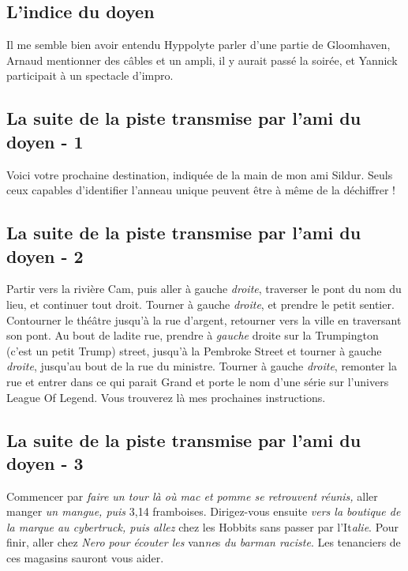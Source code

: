 \documentclass[12pt]{article}
\begin{document}
\subsection{L'indice du doyen}

Il me semble bien avoir entendu Hyppolyte parler d'une partie de Gloomhaven, Arnaud mentionner des câbles et un ampli, il y aurait passé la soirée, et Yannick participait à un spectacle d'impro.

\subsection{La suite de la piste transmise par l'ami du doyen - 1}

Voici votre prochaine destination, indiquée de la main de mon ami Sildur. Seuls ceux capables d'identifier l'anneau unique peuvent être à même de la déchiffrer !


\subsection{La suite de la piste transmise par l'ami du doyen - 2}

Partir vers la rivière Cam, puis aller à gauche {\it droite}, traverser le pont du nom du lieu, et continuer tout droit.
Tourner à gauche {\it droite}, et prendre le petit sentier.
Contourner le théâtre jusqu'à la rue d'argent, retourner vers la ville en traversant son pont. Au bout de ladite rue, prendre à {\it gauche} droite sur la Trumpington (c'est un petit Trump) street, jusqu'à la Pembroke Street et tourner à gauche {\it droite}, jusqu'au bout de la rue du ministre. Tourner à gauche {\it droite}, remonter la rue et entrer dans ce qui parait Grand et porte le nom d'une série sur l'univers League Of Legend. Vous trouverez là mes prochaines instructions.

\subsection{La suite de la piste transmise par l'ami du doyen - 3}

Commencer par {\it faire un tour là où mac et pomme se retrouvent réunis,} aller manger {\it un mangue, puis} 3,14 framboises. Dirigez-vous ensuite {\it vers la boutique de la marque au cybertruck, puis allez} chez les Hobbits sans passer par l'It{\it alie}. Pour finir, aller chez {\it Nero pour écouter les} van{\it ne}s {\it du barman raciste}. Les tenanciers de ces magasins sauront vous aider.
\end{document}
